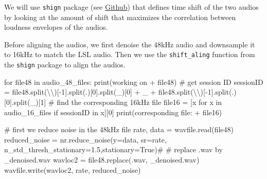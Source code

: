 \documentclass[
  letterpaper,
  DIV=11,
  numbers=noendperiod]{scrreprt}
\newenvironment{Shaded}{\begin{snugshade}}{\end{snugshade}}
\newcommand{\BuiltInTok}[1]{\textcolor[rgb]{0.00,0.23,0.31}{#1}}
\newcommand{\CharTok}[1]{\textcolor[rgb]{0.13,0.47,0.30}{#1}}
\newcommand{\CommentTok}[1]{\textcolor[rgb]{0.37,0.37,0.37}{#1}}
\newcommand{\ControlFlowTok}[1]{\textcolor[rgb]{0.00,0.23,0.31}{#1}}
\newcommand{\DecValTok}[1]{\textcolor[rgb]{0.68,0.00,0.00}{#1}}
\newcommand{\FloatTok}[1]{\textcolor[rgb]{0.68,0.00,0.00}{#1}}
\newcommand{\KeywordTok}[1]{\textcolor[rgb]{0.00,0.23,0.31}{#1}}
\newcommand{\NormalTok}[1]{\textcolor[rgb]{0.00,0.23,0.31}{#1}}
\newcommand{\OperatorTok}[1]{\textcolor[rgb]{0.37,0.37,0.37}{#1}}
\newcommand{\StringTok}[1]{\textcolor[rgb]{0.13,0.47,0.30}{#1}}
\newcommand{\VariableTok}[1]{\textcolor[rgb]{0.07,0.07,0.07}{#1}}
\begin{document}
We will use \texttt{shign} package (see
\href{https://github.com/KnurpsBram/shign}{Github}) that defines time
shift of the two audios by looking at the amount of shift that maximizes
the correlation between loudness envelopes of the audios.

Before aligning the audios, we first denoise the 48kHz audio and
downsample it to 16kHz to match the LSL audio. Then we use the
\texttt{shift\_aling} function from the \texttt{shign} package to align
the audios.

\begin{Shaded}
\begin{Highlighting}[]
\ControlFlowTok{for}\NormalTok{ file48 }\KeywordTok{in}\NormalTok{ audio\_48\_files:}
    \BuiltInTok{print}\NormalTok{(}\StringTok{\textquotesingle{}working on\textquotesingle{}} \OperatorTok{+}\NormalTok{ file48)}
    \CommentTok{\# get session ID}
\NormalTok{    sessionID }\OperatorTok{=}\NormalTok{ file48.split(}\StringTok{\textquotesingle{}}\CharTok{\textbackslash{}\textbackslash{}}\StringTok{\textquotesingle{}}\NormalTok{)[}\OperatorTok{{-}}\DecValTok{1}\NormalTok{].split(}\StringTok{\textquotesingle{}.\textquotesingle{}}\NormalTok{)[}\DecValTok{0}\NormalTok{].split(}\StringTok{\textquotesingle{}\_\textquotesingle{}}\NormalTok{)[}\DecValTok{0}\NormalTok{] }\OperatorTok{+} \StringTok{\textquotesingle{}\_\textquotesingle{}} \OperatorTok{+}\NormalTok{ file48.split(}\StringTok{\textquotesingle{}}\CharTok{\textbackslash{}\textbackslash{}}\StringTok{\textquotesingle{}}\NormalTok{)[}\OperatorTok{{-}}\DecValTok{1}\NormalTok{].split(}\StringTok{\textquotesingle{}.\textquotesingle{}}\NormalTok{)[}\DecValTok{0}\NormalTok{].split(}\StringTok{\textquotesingle{}\_\textquotesingle{}}\NormalTok{)[}\DecValTok{1}\NormalTok{]}
    \CommentTok{\# find the corresponding 16kHz file}
\NormalTok{    file16 }\OperatorTok{=}\NormalTok{ [x }\ControlFlowTok{for}\NormalTok{ x }\KeywordTok{in}\NormalTok{ audio\_16\_files }\ControlFlowTok{if}\NormalTok{ sessionID }\KeywordTok{in}\NormalTok{ x][}\DecValTok{0}\NormalTok{]}
    \BuiltInTok{print}\NormalTok{(}\StringTok{\textquotesingle{}corresponding file:\textquotesingle{}} \OperatorTok{+}\NormalTok{ file16)}

    \CommentTok{\# first we reduce noise in the 48kHz file}
\NormalTok{    rate, data }\OperatorTok{=}\NormalTok{ wavfile.read(file48)}
\NormalTok{    reduced\_noise }\OperatorTok{=}\NormalTok{ nr.reduce\_noise(y}\OperatorTok{=}\NormalTok{data, sr}\OperatorTok{=}\NormalTok{rate, n\_std\_thresh\_stationary}\OperatorTok{=}\FloatTok{1.5}\NormalTok{,stationary}\OperatorTok{=}\VariableTok{True}\NormalTok{)}\CommentTok{\#}
    \CommentTok{\# replace .wav by \_denoised.wav}
\NormalTok{    wavloc2 }\OperatorTok{=}\NormalTok{ file48.replace(}\StringTok{\textquotesingle{}.wav\textquotesingle{}}\NormalTok{, }\StringTok{\textquotesingle{}\_denoised.wav\textquotesingle{}}\NormalTok{)}
\NormalTok{    wavfile.write(wavloc2, rate, reduced\_noise)}


\end{Highlighting}
\end{Shaded}
\end{document}
